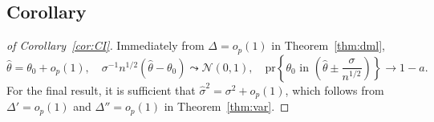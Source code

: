 \subsection{Corollary}

\begin{proof}[of Corollary~\ref{cor:CI}]
Immediately from $\Delta=o_p(1)$ in Theorem~\ref{thm:dml},
$$
\hat{\theta}=\theta_0+o_p(1),\quad
\sigma^{-1}n^{1/2}(\hat{\theta}-\theta_0)\leadsto \mathcal{N}(0,1),\quad 
 \text{pr}\left\{\theta_0 \text{ in }  \left(\hat{\theta}\pm \frac{\sigma}{n^{1/2}}\right)\right\}\rightarrow 1-a.$$
For the final result, it is sufficient that $\hat{\sigma}^2=\sigma^2+o_p(1)$, which follows from $\Delta'=o_p(1)$ and $\Delta''=o_p(1)$ in Theorem~\ref{thm:var}.
\end{proof}